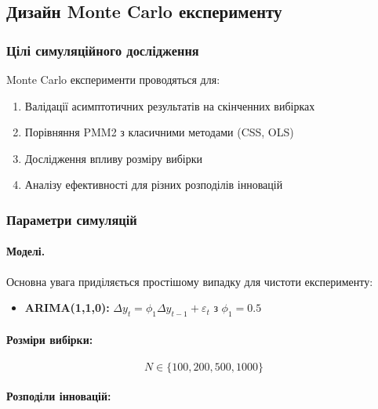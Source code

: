 \subsection{Дизайн Monte Carlo експерименту}
\label{subsec:monte_carlo_design}

\subsubsection{Цілі симуляційного дослідження}
\label{subsubsec:simulation_goals}

Monte Carlo експерименти проводяться для:
\begin{enumerate}
    \item Валідації асимптотичних результатів на скінченних вибірках
    \item Порівняння PMM2 з класичними методами (CSS, OLS)
    \item Дослідження впливу розміру вибірки
    \item Аналізу ефективності для різних розподілів інновацій
\end{enumerate}

\subsubsection{Параметри симуляцій}
\label{subsubsec:simulation_parameters}

\paragraph{Моделі.} Основна увага приділяється простішому випадку для чистоти експерименту:
\begin{itemize}
    \item \textbf{ARIMA(1,1,0):} $\Delta y_t = \phi_1 \Delta y_{t-1} + \varepsilon_t$ з $\phi_1 = 0.5$
\end{itemize}

\paragraph{Розміри вибірки:}
$$N \in \{100, 200, 500, 1000\}$$

\paragraph{Розподіли інновацій:}

